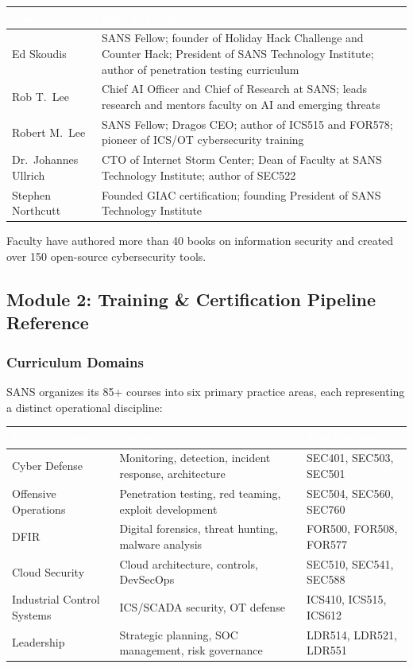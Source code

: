 \documentclass[11pt,letterpaper]{article}
\newcommand{\tableheader}[1]{\textbf{\sffamily\textcolor{white}{#1}}}
\begin{document}
\begin{center}
\begin{tabularx}{\textwidth}{L{3.5cm}X}
\toprule
{}
\tableheader{Name} & \tableheader{Role \& Contribution} \\
\midrule
Ed Skoudis & SANS Fellow; founder of Holiday Hack Challenge and Counter Hack; President of SANS Technology Institute; author of penetration testing curriculum \\
Rob T.\ Lee & Chief AI Officer and Chief of Research at SANS; leads research and mentors faculty on AI and emerging threats \\
Robert M.\ Lee & SANS Fellow; Dragos CEO; author of ICS515 and FOR578; pioneer of ICS/OT cybersecurity training \\
Dr.\ Johannes Ullrich & CTO of Internet Storm Center; Dean of Faculty at SANS Technology Institute; author of SEC522 \\
Stephen Northcutt & Founded GIAC certification; founding President of SANS Technology Institute \\
\bottomrule
\end{tabularx}
\end{center}

Faculty have authored more than 40 books on information security and created over 150 open-source cybersecurity tools.

\subsection{Module 2: Training \& Certification Pipeline Reference}

\subsubsection{Curriculum Domains}

SANS organizes its 85+ courses into six primary practice areas, each representing a distinct operational discipline:

\begin{center}
\begin{tabularx}{\textwidth}{L{3cm}XL{2.5cm}}
\toprule
{}
\tableheader{Practice Area} & \tableheader{Focus} & \tableheader{Key Courses} \\
\midrule
Cyber Defense & Monitoring, detection, incident response, architecture & SEC401, SEC503, SEC501 \\
Offensive Operations & Penetration testing, red teaming, exploit development & SEC504, SEC560, SEC760 \\
DFIR & Digital forensics, threat hunting, malware analysis & FOR500, FOR508, FOR577 \\
Cloud Security & Cloud architecture, controls, DevSecOps & SEC510, SEC541, SEC588 \\
Industrial Control Systems & ICS/SCADA security, OT defense & ICS410, ICS515, ICS612 \\
Leadership & Strategic planning, SOC management, risk governance & LDR514, LDR521, LDR551 \\
\bottomrule
\end{tabularx}
\end{center}
\end{document}
